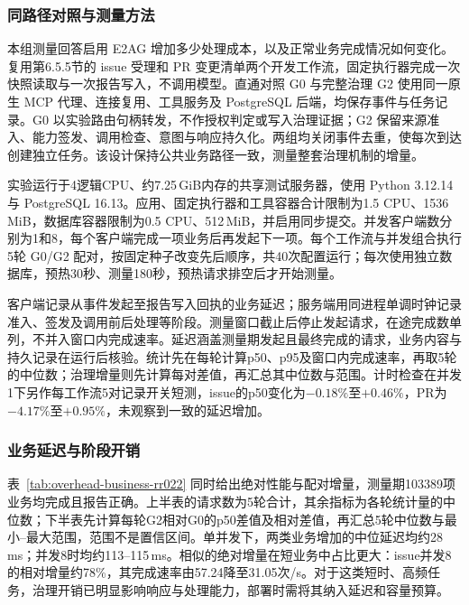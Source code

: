 \subsubsection{同路径对照与测量方法}

本组测量回答启用 E2AG 增加多少处理成本，以及正常业务完成情况如何变化。复用第6.5.5节的 issue 受理和 PR 变更清单两个开发工作流，固定执行器完成一次快照读取与一次报告写入，不调用模型。直通对照 G0 与完整治理 G2 使用同一原生 MCP 代理、连接复用、工具服务及 PostgreSQL 后端，均保存事件与任务记录。G0 以实验路由句柄转发，不作授权判定或写入治理证据；G2 保留来源准入、能力签发、调用检查、意图与响应持久化。两组均关闭事件去重，使每次到达创建独立任务。该设计保持公共业务路径一致，测量整套治理机制的增量。

实验运行于4逻辑CPU、约7.25\,GiB内存的共享测试服务器，使用 Python 3.12.14 与 PostgreSQL 16.13。应用、固定执行器和工具容器合计限制为1.5 CPU、1536\,MiB，数据库容器限制为0.5 CPU、512\,MiB，并启用同步提交。并发客户端数分别为1和8，每个客户端完成一项业务后再发起下一项。每个工作流与并发组合执行5轮 G0/G2 配对，按固定种子改变先后顺序，共40次配置运行；每次使用独立数据库，预热30秒、测量180秒，预热请求排空后才开始测量。

客户端记录从事件发起至报告写入回执的业务延迟；服务端用同进程单调时钟记录准入、签发及调用前后处理等阶段。测量窗口截止后停止发起请求，在途完成数单列，不并入窗口内完成速率。延迟涵盖测量期发起且最终完成的请求，业务内容与持久记录在运行后核验。统计先在每轮计算p50、p95及窗口内完成速率，再取5轮的中位数；治理增量则先计算每对差值，再汇总其中位数与范围。计时检查在并发1下另作每工作流5对记录开关短测，issue的p50变化为$-0.18\%$至$+0.46\%$，PR为$-4.17\%$至$+0.95\%$，未观察到一致的延迟增加。

\subsubsection{业务延迟与阶段开销}

表~\ref{tab:overhead-business-rr022} 同时给出绝对性能与配对增量，测量期103389项业务均完成且报告正确。上半表的请求数为5轮合计，其余指标为各轮统计量的中位数；下半表先计算每轮G2相对G0的p50差值及相对差值，再汇总5轮中位数与最小--最大范围，范围不是置信区间。单并发下，两类业务增加的中位延迟均约28\,ms；并发8时均约113--115\,ms。相似的绝对增量在短业务中占比更大：issue并发8的相对增量约78\%，其完成速率由57.24降至31.05次/s。对于这类短时、高频任务，治理开销已明显影响响应与处理能力，部署时需将其纳入延迟和容量预算。



